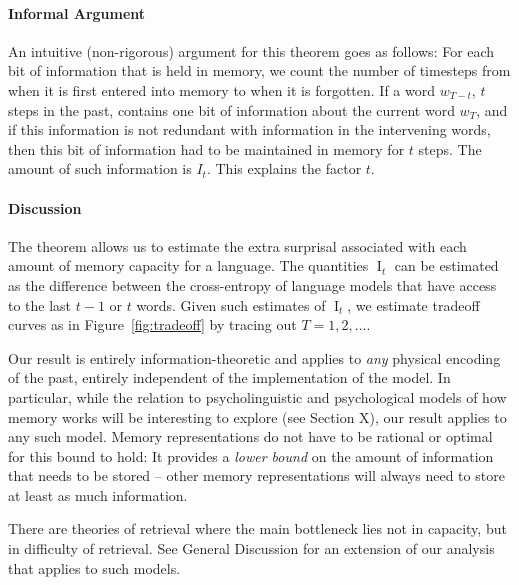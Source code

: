 \paragraph{Informal Argument}
An intuitive (non-rigorous) argument for this theorem goes as follows:
For each bit of information that is held in memory, we count the number of timesteps from when it is first entered into memory to when it is forgotten.
If a word $w_{T-t}$, $t$ steps in the past, contains one bit of information about the current word $w_T$, and if this information is not redundant with information in the intervening words, then this bit of information had to be maintained in memory for $t$ steps.
The amount of such information is $I_t$. This explains the factor $t$.


\paragraph{Discussion}
The theorem allows us to estimate the extra surprisal associated with each amount of memory capacity for a language.
The quantities $\operatorname{I}_t$ can be estimated as the difference between the cross-entropy of language models that have access to the last $t-1$ or $t$ words.
Given such estimates of $\operatorname{I}_t$, we estimate tradeoff curves as in Figure~\ref{fig:tradeoff} by tracing out $T=1, 2, \dots$.


Our result is entirely information-theoretic and applies to \emph{any} physical encoding of the past, entirely independent of the implementation of the model. %
In particular, while the relation to psycholinguistic and psychological models of how memory works will be interesting to explore (see Section X), our result applies to any such model.
Memory representations do not have to be rational or optimal for this bound to hold:
It provides a \emph{lower bound} on the amount of information that needs to be stored -- other memory representations will always need to store at least as much information.



There are theories of retrieval where the main bottleneck lies not in capacity, but in difficulty of retrieval. See General Discussion for an extension of our analysis that applies to such models.




